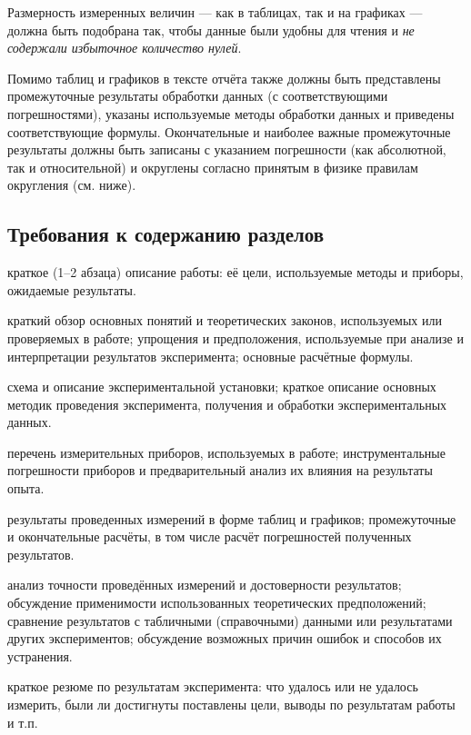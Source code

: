 Размерность измеренных величин --- как в таблицах, так и
на графиках --- должна быть подобрана так, чтобы данные
были удобны для чтения и \emph{не содержали избыточное количество
нулей}.

Помимо таблиц и графиков в тексте отчёта также должны быть представлены
промежуточные результаты обработки данных (с соответствующими погрешностями),
указаны используемые методы обработки данных и приведены соответствующие
формулы. Окончательные и наиболее важные промежуточные результаты
должны быть записаны с указанием погрешности (как абсолютной, так
и относительной) и округлены согласно принятым в физике правилам округления
(см. ниже).

\subsection{Требования к содержанию разделов}
\begin{description}\small
\item [{Аннотация:}] краткое (1--2 абзаца) описание работы: её
цели, используемые методы и приборы, ожидаемые результаты.
\item [{Теоретические~сведения:}] краткий обзор основных понятий и теоретических
законов, используемых или проверяемых в работе; упрощения и предположения,
используемые при анализе и интерпретации результатов эксперимента;
основные расчётные формулы.
\item [{Методика~измерений:}] схема и описание экспериментальной установки;
краткое описание основных методик проведения эксперимента, получения
и обработки экспериментальных данных.
\item [{Используемое~оборудование:}] перечень измерительных приборов,
используемых в работе; инструментальные погрешности приборов и предварительный
анализ их влияния на результаты опыта.
\item [{Результаты~измерений~и~обработка~данных:}] результаты проведенных
измерений в форме таблиц и графиков; промежуточные и окончательные
расчёты, в том числе расчёт погрешностей полученных результатов.
\item [{Обсуждение~результатов:}] анализ точности проведённых измерений
и достоверности результатов; обсуждение применимости использованных
теоретических предположений; сравнение результатов с табличными (справочными)
данными или результатами других экспериментов; обсуждение возможных
причин ошибок и способов их устранения.
\item [{Заключение~(или~выводы):}] краткое резюме по результатам эксперимента:
что удалось или не удалось измерить, были ли достигнуты поставлены
цели, выводы по результатам работы и т.п.
\end{description}

